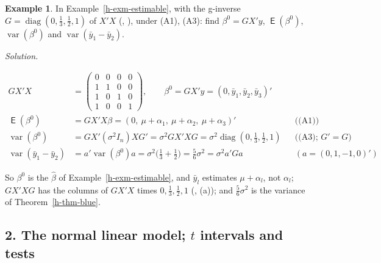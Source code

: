 \documentclass[12pt]{article}
\DeclareMathOperator{\diag}{diag}
\DeclareMathOperator\expc{\mathsf{E}}
\DeclareMathOperator\var{var}
\theoremstyle{definition}
\newtheorem{example}[theorem]{Example}
\newcommand{\boardtop}{\vspace*{-\abovedisplayskip}}
\begin{document}
\begin{example}\label{h-exm-solution}
In Example~\ref{h-exm-estimable}, with the g-inverse \(G=\diag(0,\frac13,\frac12,1)\) of \(X'X\) (,
), under (A1), (A3): find \(\beta^0=GX'y\), \(\expc(\beta^0)\), \(\var(\beta^0)\) and
\(\var(\bar y_1-\bar y_2)\).
\end{example}
\textit{Solution.}
\begin{board}
\boardtop
\begin{align*}
GX'X&=\begin{pmatrix}0&0&0&0\\1&1&0&0\\1&0&1&0\\1&0&0&1\end{pmatrix},\qquad
\beta^0=GX'y=(0,\bar y_1,\bar y_2,\bar y_3)'\\
\expc(\beta^0)&=GX'X\beta=(0,\ \mu+\alpha_1,\ \mu+\alpha_2,\ \mu+\alpha_3)'&&\text{((A1))}\\
\var(\beta^0)&=GX'(\sigma^2I_n)XG'=\sigma^2GX'XG=\sigma^2\diag(0,\tfrac13,\tfrac12,1)&&\text{((A3); \(G'=G\))}\\
\var(\bar y_1-\bar y_2)&=a'\var(\beta^0)a=\sigma^2\bigl(\tfrac13+\tfrac12\bigr)=\tfrac56\sigma^2=\sigma^2a'Ga&&(a=(0,1,-1,0)')
\end{align*}
\end{board}
So \(\beta^0\) is the \(\hat\beta\) of Example~\ref{h-exm-estimable}, and \(\bar y_l\) estimates \(\mu+\alpha_l\), not
\(\alpha_l\); \(GX'XG\) has the columns of \(GX'X\) times \(0,\frac13,\frac12,1\) (, (a)); and
\(\frac56\sigma^2\) is the variance of Theorem~\ref{h-thm-blue}.

\subsection*{2. The normal linear model; \(t\) intervals and tests}
\end{document}

